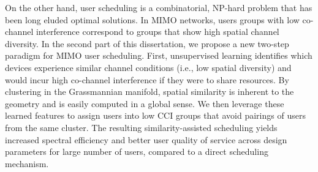 On the other hand, user scheduling is a combinatorial, NP-hard problem that has been long eluded optimal solutions. 
In MIMO networks, users groups with low co-channel interference correspond to groups that show high spatial channel diversity. 
In the second part of this dissertation, we propose a new two-step paradigm for MIMO user scheduling. First, unsupervised learning identifies which devices experience similar channel conditions (i.e., low spatial diversity) and would incur high co-channel interference if they were to share resources. By clustering in the Grassmannian manifold, spatial similarity is inherent to the geometry and is easily computed in a global sense. We then leverage these learned features to assign users into low CCI groups that avoid pairings of users from the same cluster. The resulting similarity-assisted scheduling yields increased spectral efficiency and better user quality of service across design parameters for large number of users, compared to a direct scheduling mechanism.








